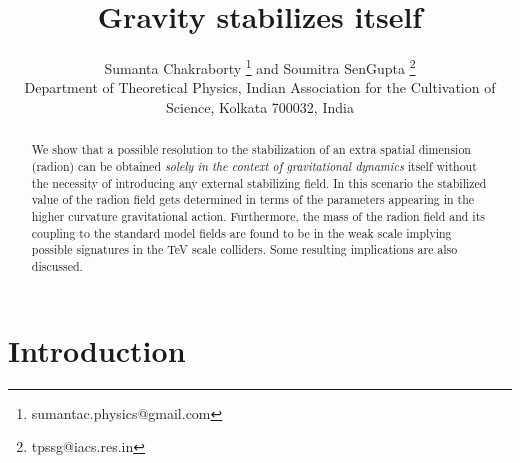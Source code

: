 \documentclass{article}
\title{Gravity stabilizes itself}
\author{Sumanta Chakraborty
\footnote{sumantac.physics@gmail.com} and Soumitra SenGupta
\footnote{tpssg@iacs.res.in}\\
{\small{Department of Theoretical Physics, Indian Association for the Cultivation of Science, Kolkata 700032, India}}}
\begin{document}
\maketitle
\begin{abstract}
We show that a possible resolution to the stabilization of an extra spatial dimension (radion) can be obtained \emph{solely in the context of gravitational dynamics} itself without the necessity of introducing any external stabilizing field. In this scenario the stabilized value of the radion field gets determined in terms of the parameters appearing in the higher curvature gravitational action. Furthermore, the mass of the radion field and its coupling to the standard model fields are found to be in the weak scale implying possible signatures in the TeV scale colliders. Some resulting implications are also discussed.
\end{abstract}

\section{Introduction}
\end{document}
